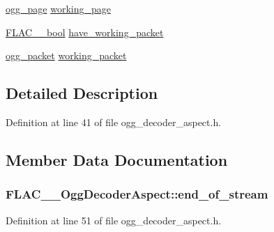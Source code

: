 \begin{DoxyCompactItemize}
\item 
\hyperlink{structogg__page}{ogg\+\_\+page} \hyperlink{struct_f_l_a_c_____ogg_decoder_aspect_a10e8b43565637bff6c560be3530a5327}{working\+\_\+page}
\item 
\hyperlink{ordinals_8h_a95103469f1cbd78b8cf250194985b34e}{F\+L\+A\+C\+\_\+\+\_\+bool} \hyperlink{struct_f_l_a_c_____ogg_decoder_aspect_a81e82436142f6a79c584520d11b2fe9f}{have\+\_\+working\+\_\+packet}
\item 
\hyperlink{structogg__packet}{ogg\+\_\+packet} \hyperlink{struct_f_l_a_c_____ogg_decoder_aspect_a1cf1159682cc9efc7597d426fcf2bdf4}{working\+\_\+packet}
\end{DoxyCompactItemize}


\subsection{Detailed Description}


Definition at line 41 of file ogg\+\_\+decoder\+\_\+aspect.\+h.



\subsection{Member Data Documentation}
\subsubsection[{\texorpdfstring{end\+\_\+of\+\_\+stream}{end_of_stream}}]{ F\+L\+A\+C\+\_\+\+\_\+\+Ogg\+Decoder\+Aspect\+::end\+\_\+of\+\_\+stream}\hypertarget{struct_f_l_a_c_____ogg_decoder_aspect_ab36b114f42b83331b5149cc2eb2148af}{}\label{struct_f_l_a_c_____ogg_decoder_aspect_ab36b114f42b83331b5149cc2eb2148af}


Definition at line 51 of file ogg\+\_\+decoder\+\_\+aspect.\+h.

